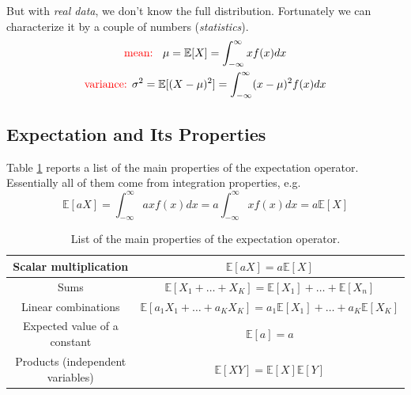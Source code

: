 \documentclass[12pt,a4paper]{book}
\begin{document}
But with \textit{real data}, we don't know the full distribution. Fortunately we can characterize it by a couple of numbers (\emph{statistics}).
\begin{equation}
\begin{gathered}
\text{\textcolor{red}{mean: }
} \mu = \mathbb{E}[X] = \int_{-\infty}^{\infty} xf(x)dx \\
\text{\textcolor{red}{variance: }}  
\sigma^2 = \mathbb{E}[(X-\mu)^2] =\int_{-\infty}^{\infty} (x-\mu)^2f(x)dx
\end{gathered}
\end{equation}

\subsection{Expectation and Its Properties}
Table \ref{tab:expectation_prop} reports a list of the main properties of the expectation operator.
Essentially all of them come from integration properties, e.g.
\begin{equation*}
	\mathbb{E}[aX] = \int_{-\infty}^{\infty} ax f(x) dx = a  \int_{-\infty}^{\infty} x f(x) dx = a\mathbb{E}[X]
\end{equation*}

\renewcommand{\arraystretch}{1.4}
\begin{table}[hbt]
	\begin{center}
		\begin{tabular}{|c|c|} \hline
			Scalar multiplication & $\mathbb{E}[aX] = a\mathbb{E}[X]$ \\ \hline
			Sums & $\mathbb{E}[X_1+\ldots +X_K] =  \mathbb{E}[X_1] +\ldots + \mathbb{E}[X_n]$ \\ \hline
			Linear combinations & $\mathbb{E}[a_1X_1+\ldots +a_KX_K] =  a_1\mathbb{E}[X_1] +\ldots + a_K\mathbb{E}[X_K]$ \\ \hline
			Expected value of a constant & $\mathbb{E}[a] = a$ \\ \hline
			Products (independent variables) & $\mathbb{E}[XY] = \mathbb{E}[X] \mathbb{E}[Y]$ \\ \hline
		\end{tabular}
	\end{center}
\label{tab:expectation_prop}
\caption{List of the main properties of the expectation operator.}
\end{table}
\end{document}
